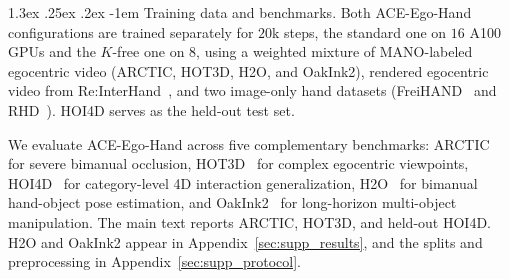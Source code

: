 \documentclass[10pt,twocolumn,letterpaper]{article}
\makeatletter
\renewcommand\paragraph{\@startsection{paragraph}{4}{\z@}%
  {1.3ex \@plus .25ex \@minus .2ex}%
  {-1em}%
  {\normalfont\normalsize\bfseries}}
\newcommand{\method}{ACE-Ego-Hand} %
\makeatother
\begin{document}
\paragraph{Training data and benchmarks.}
Both \method{} configurations are trained separately for $20$k steps, the standard one on $16$ A100 GPUs and the $K$-free one on $8$, using a weighted mixture of MANO-labeled egocentric video (ARCTIC, HOT3D, H2O, and OakInk2), rendered egocentric video from Re:InterHand~\citep{reinterhand2023}, and two image-only hand datasets (FreiHAND~\citep{freihand2019} and RHD~\citep{rhd2017}). HOI4D serves as the held-out test set.

We evaluate \method{} across five complementary benchmarks: ARCTIC~\citep{arctic2023} for severe bimanual occlusion, HOT3D~\citep{hot3d2024} for complex egocentric viewpoints, HOI4D~\citep{hoi4d2022} for category-level 4D interaction generalization, H2O~\citep{h2o2021} for bimanual hand-object pose estimation, and OakInk2~\citep{oakink2_2024} for long-horizon multi-object manipulation. The main text reports ARCTIC, HOT3D, and held-out HOI4D. H2O and OakInk2 appear in Appendix~\ref{sec:supp_results}, and the splits and preprocessing in Appendix~\ref{sec:supp_protocol}.
\end{document}
